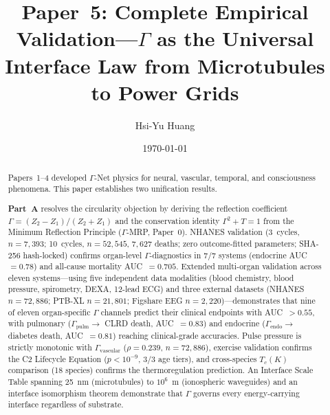 \documentclass[aps,pre,twocolumn,superscriptaddress,floatfix]{revtex4-2}
\begin{document}
\newcommand{\ZFP}{zero outcome-fitted parameters}

\title{Paper~5: Complete Empirical Validation---$\Gamma$ as the
Universal Interface Law from Microtubules to Power Grids}

\author{Hsi-Yu Huang}

\date{\today}


\begin{abstract}
Papers~1--4 developed $\Gamma$-Net physics for neural,
vascular, temporal, and consciousness phenomena.
This paper establishes two unification results.

\textbf{Part~A} resolves the circularity objection
by deriving the reflection coefficient
$\Gamma = (Z_2 - Z_1)/(Z_2 + Z_1)$ and the conservation
identity $\Gamma^2 + T = 1$ from the Minimum Reflection
Principle ($\Gamma$-MRP, Paper~0).
NHANES validation (3~cycles, $n = 7{,}393$; 10~cycles,
$n = 52{,}545$, $7{,}627$ deaths; zero outcome-fitted parameters; SHA-256
hash-locked) confirms organ-level $\Gamma$-diagnostics
in 7/7 systems (endocrine AUC~$= 0.78$) and all-cause
mortality AUC~$= 0.705$.
Extended multi-organ validation across eleven systems---using
five independent data modalities (blood chemistry, blood
pressure, spirometry, DEXA, 12-lead ECG) and three
external datasets (NHANES $n = 72{,}886$; PTB-XL
$n = 21{,}801$; Figshare EEG $n = 2{,}220$)---demonstrates
that nine of eleven organ-specific $\Gamma$ channels
predict their clinical endpoints with AUC~$> 0.55$,
with pulmonary ($\Gamma_{\text{pulm}} \to$ CLRD death,
AUC~$= 0.83$) and endocrine ($\Gamma_{\text{endo}} \to$
diabetes death, AUC~$= 0.81$) reaching clinical-grade
accuracies.
Pulse pressure is strictly monotonic with
$\Gamma_{\text{vascular}}$ ($\rho = 0.239$,
$n = 72{,}886$), exercise validation confirms the C2
Lifecycle Equation ($p < 10^{-9}$, 3/3 age tiers),
and cross-species $T_c(K)$ comparison (18 species)
confirms the thermoregulation prediction.
An Interface Scale Table spanning 25~nm (microtubules)
to $10^6$~m (ionospheric waveguides) and an interface
isomorphism theorem demonstrate that $\Gamma$ governs
every energy-carrying interface regardless of substrate.


\end{abstract}
\end{document}
